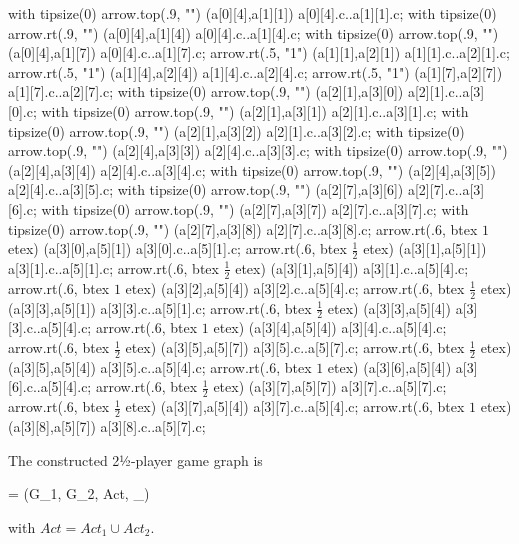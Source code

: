     with tipsize(0) arrow.top(.9, "") (a[0][4],a[1][1]) a[0][4].c..a[1][1].c;
    with tipsize(0) arrow.rt(.9, "") (a[0][4],a[1][4]) a[0][4].c..a[1][4].c;
    with tipsize(0) arrow.top(.9, "") (a[0][4],a[1][7]) a[0][4].c..a[1][7].c;
    arrow.rt(.5, "1") (a[1][1],a[2][1]) a[1][1].c..a[2][1].c;
    arrow.rt(.5, "1") (a[1][4],a[2][4]) a[1][4].c..a[2][4].c;
    arrow.rt(.5, "1") (a[1][7],a[2][7]) a[1][7].c..a[2][7].c;
    with tipsize(0) arrow.top(.9, "") (a[2][1],a[3][0]) a[2][1].c..a[3][0].c;
    with tipsize(0) arrow.top(.9, "") (a[2][1],a[3][1]) a[2][1].c..a[3][1].c;
    with tipsize(0) arrow.top(.9, "") (a[2][1],a[3][2]) a[2][1].c..a[3][2].c;
    with tipsize(0) arrow.top(.9, "") (a[2][4],a[3][3]) a[2][4].c..a[3][3].c;
    with tipsize(0) arrow.top(.9, "") (a[2][4],a[3][4]) a[2][4].c..a[3][4].c;
    with tipsize(0) arrow.top(.9, "") (a[2][4],a[3][5]) a[2][4].c..a[3][5].c;
    with tipsize(0) arrow.top(.9, "") (a[2][7],a[3][6]) a[2][7].c..a[3][6].c;
    with tipsize(0) arrow.top(.9, "") (a[2][7],a[3][7]) a[2][7].c..a[3][7].c;
    with tipsize(0) arrow.top(.9, "") (a[2][7],a[3][8]) a[2][7].c..a[3][8].c;
    arrow.rt(.6, btex $1$ etex) (a[3][0],a[5][1]) a[3][0].c..a[5][1].c;
    arrow.rt(.6, btex $\frac{1}{2}$ etex) (a[3][1],a[5][1]) a[3][1].c..a[5][1].c;
    arrow.rt(.6, btex $\frac{1}{2}$ etex) (a[3][1],a[5][4]) a[3][1].c..a[5][4].c;
    arrow.rt(.6, btex $1$ etex) (a[3][2],a[5][4]) a[3][2].c..a[5][4].c;
    arrow.rt(.6, btex $\frac{1}{2}$ etex) (a[3][3],a[5][1]) a[3][3].c..a[5][1].c;
    arrow.rt(.6, btex $\frac{1}{2}$ etex) (a[3][3],a[5][4]) a[3][3].c..a[5][4].c;
    arrow.rt(.6, btex $1$ etex) (a[3][4],a[5][4]) a[3][4].c..a[5][4].c;
    arrow.rt(.6, btex $\frac{1}{2}$ etex) (a[3][5],a[5][7]) a[3][5].c..a[5][7].c;
    arrow.rt(.6, btex $\frac{1}{2}$ etex) (a[3][5],a[5][4]) a[3][5].c..a[5][4].c;
    arrow.rt(.6, btex $1$ etex) (a[3][6],a[5][4]) a[3][6].c..a[5][4].c;
    arrow.rt(.6, btex $\frac{1}{2}$ etex) (a[3][7],a[5][7]) a[3][7].c..a[5][7].c;
    arrow.rt(.6, btex $\frac{1}{2}$ etex) (a[3][7],a[5][4]) a[3][7].c..a[5][4].c;
    arrow.rt(.6, btex $1$ etex) (a[3][8],a[5][7]) a[3][8].c..a[5][7].c;
\stopreusableMPgraphic

\startsubsection[title={Synopsis},reference=sec:abstraction-graph-synopsis]

    The constructed 2½-player game graph is

    \startformula
        \GameGraph = (G_1, G_2, Act, \Transition_\GameGraph) \EndComma
    \stopformula

    with $Act = Act_1 \cup Act_2$.

